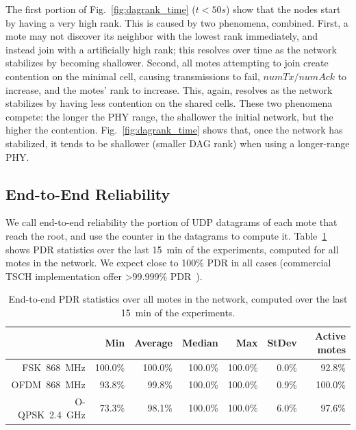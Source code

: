 \documentclass[sensors,article,submit,moreauthors,pdftex]{Definitions/mdpi}
\newcommand{\fsk}           {FSK~868~MHz}
\newcommand{\oqpsk}         {O-QPSK~2.4~GHz}
\newcommand{\ofdm}          {OFDM~868~MHz}
\begin{document}
The first portion of Fig.~\ref{fig:dagrank_time} ($t<50s$) show that the nodes start by having a very high rank.
This is caused by two phenomena, combined.
First, a mote may not discover its neighbor with the lowest rank immediately, and instead join with a artificially high rank; this resolves over time as the network stabilizes by becoming shallower.
Second, all motes attempting to join create contention on the minimal cell, causing
    transmissions to fail,
    $numTx/numAck$ to increase, and
    the motes' rank to increase.
This, again, resolves as the network stabilizes by having less contention on the shared cells.
These two phenomena compete: the longer the PHY range, the shallower the initial network, but the higher the contention.
Fig.~\ref{fig:dagrank_time} shows that, once the network has stabilized, it tends to be shallower (smaller DAG rank) when using a longer-range PHY.

\subsection{End-to-End Reliability}
\label{sec:res_reliability}


We call end-to-end reliability the portion of UDP datagrams of each mote that reach the root, and use the counter in the datagrams to compute it.
Table~\ref{tab:pdr_table} shows PDR statistics over the last 15~min of the experiments, computed for all motes in the network.
We expect close to 100\% PDR in all cases (commercial TSCH implementation offer >99.999\% PDR~\cite{vucinic20key}).

\begin{table}
    \centering
    \begin{tabular}{|r|r|r|r|r|r|r|}
        \hline
                &      Min &  Average &   Median &      Max &  StDev & Active motes \\ \hline
        \fsk    &  100.0\% &  100.0\% &  100.0\% &  100.0\% &  0.0\% &       92.8\% \\ \hline
        \ofdm   &   93.8\% &   99.8\% &  100.0\% &  100.0\% &  0.9\% &      100.0\% \\ \hline
        \oqpsk  &   73.3\% &   98.1\% &  100.0\% &  100.0\% &  6.0\% &       97.6\% \\ \hline
    \end{tabular}
    \caption{End-to-end PDR statistics over all motes in the network, computed over the last 15~min of the experiments.}
    \label{tab:pdr_table}
\end{table}
\end{document}
